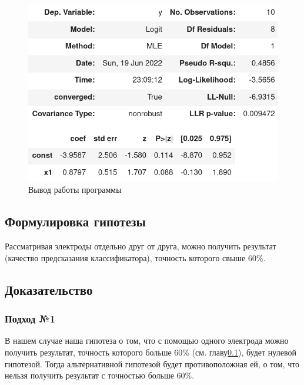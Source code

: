 \begin{figure}[H]
    \centering
    \includegraphics[width=0.7\linewidth]{images/13.png}
    \caption{Вывод работы программы}
    \label{fig_14}
\end{figure}

\subsection{Формулировка гипотезы}

\label{sec:hypothesis}
\begin{flushleft}
    Рассматривая электроды отдельно друг от друга, можно получить результат (качество
    предсказания классификатора), точность которого свыше 60\%.
\end{flushleft} 


\subsection{Доказательство}

\subsubsection{Подход №1}
В нашем случае наша гипотеза о том, что с помощью одного электрода можно получить результат,
точность которого больше 60\%
(см. главу\ref{sec:hypothesis}), будет нулевой гипотезой. Тогда альтернативной гипотезой будет 
противоположная ей, о том, что нельзя получить результат с точностью больше 60\%.

